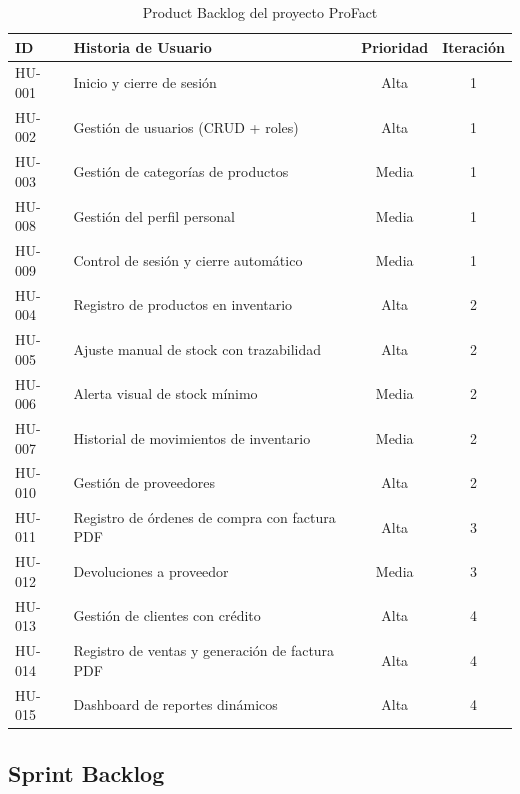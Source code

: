 \documentclass[12pt, letterpaper]{report}
\begin{document}
\begin{table}[H]
\centering
\caption{Product Backlog del proyecto ProFact}
\label{tab:pb}
\renewcommand{\arraystretch}{1.2}
\begin{tabularx}{\textwidth}{|l|X|c|c|}
\hline
\textbf{ID} & \textbf{Historia de Usuario} & \textbf{Prioridad} & \textbf{Iteración} \\ \hline
HU-001 & Inicio y cierre de sesión & Alta & 1 \\ \hline
HU-002 & Gestión de usuarios (CRUD + roles) & Alta & 1 \\ \hline
HU-003 & Gestión de categorías de productos & Media & 1 \\ \hline
HU-008 & Gestión del perfil personal & Media & 1 \\ \hline
HU-009 & Control de sesión y cierre automático & Media & 1 \\ \hline
HU-004 & Registro de productos en inventario & Alta & 2 \\ \hline
HU-005 & Ajuste manual de stock con trazabilidad & Alta & 2 \\ \hline
HU-006 & Alerta visual de stock mínimo & Media & 2 \\ \hline
HU-007 & Historial de movimientos de inventario & Media & 2 \\ \hline
HU-010 & Gestión de proveedores & Alta & 2 \\ \hline
HU-011 & Registro de órdenes de compra con factura PDF & Alta & 3 \\ \hline
HU-012 & Devoluciones a proveedor & Media & 3 \\ \hline
HU-013 & Gestión de clientes con crédito & Alta & 4 \\ \hline
HU-014 & Registro de ventas y generación de factura PDF & Alta & 4 \\ \hline
HU-015 & Dashboard de reportes dinámicos & Alta & 4 \\ \hline
\end{tabularx}
\end{table}

\subsection{Sprint Backlog}
\end{document}
